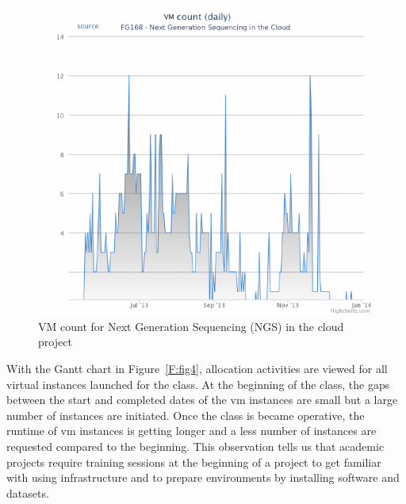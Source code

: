 \documentclass{sig-alternate-05-2015}
\begin{document}

\begin{figure}[htb] 
  \centering 
    \includegraphics[width=1.0\columnwidth]{images/fig2.pdf} 
  \caption{VM count for Next Generation Sequencing (NGS) in the cloud project}\label{F:fig3} 
\end{figure} 

With the Gantt chart in Figure~\ref{F:fig4}, allocation activities are viewed for all virtual instances launched for the class. At the beginning of the class, the gaps between the start and completed dates of the vm instances are small but a large number of instances are initiated. Once the class is became operative, the runtime of vm instances is getting longer and a less number of instances are requested compared to the beginning. This observation tells us that academic projects require training sessions at the beginning of a project to get familiar with using infrastructure and to prepare environments by installing software and datasets.
\end{document}
